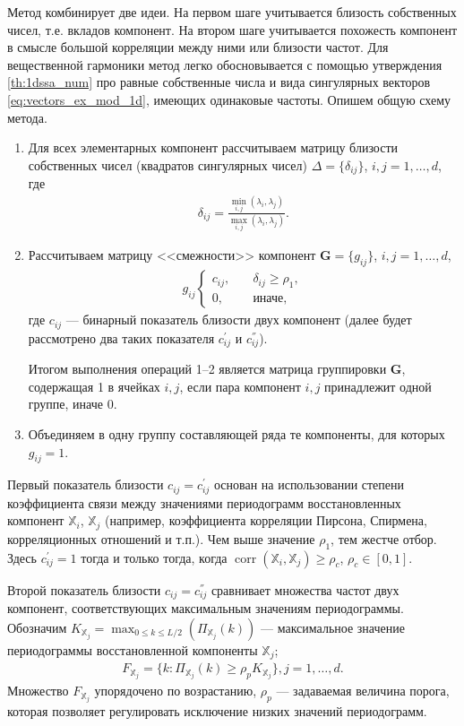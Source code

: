 \documentclass[specialist,
               substylefile = spbu.rtx,
               subf,href,colorlinks=true, 12pt]{disser}
\def\corr{\mathop{\mathrm{corr}}}
\begin{document}
Метод комбинирует две идеи. На первом шаге учитывается близость собственных чисел, т.е. вкладов компонент. На втором шаге учитывается похожесть компонент в смысле большой корреляции между ними или близости частот.
Для вещественной гармоники метод легко обосновывается с помощью утверждения \ref{th:1dssa_num} про равные собственные числа и вида сингулярных векторов \eqref{eq:vectors_ex_mod_1d}, имеющих одинаковые частоты.
Опишем общую схему метода.
\begin{enumerate}
\item Для всех элементарных компонент рассчитываем матрицу близости собственных чисел (квадратов сингулярных чисел) $\Delta = \{\delta_{ij}\}$, $i,j=1,\ldots,d$, где
\begin{gather}
\label{eq:delta}
\delta_{ij} = \frac{\min_{i, j}(\lambda_i, \lambda_j)}{\max_{i,j}(\lambda_i, \lambda_j)}.
\end{gather}
\item Рассчитываем матрицу <<смежности>> компонент $\mathbf{G}=\{g_{ij}\}$, $i,j = 1,\ldots,d$,
\begin{gather} \label{eq:g_ij}
g_{ij}
\begin{cases}
c_{ij}, &\quad \delta_{ij} \geqslant \rho_1, \\
0, &\quad \text{иначе},
\end{cases}
\end{gather}
где $c_{ij}$ --- бинарный показатель близости двух компонент (далее будет рассмотрено два таких показателя  $c^{'}_{ij}$ и  $c^{''}_{ij}$).

Итогом выполнения операций 1--2 является матрица группировки $\mathbf{G}$, содержащая 1 в ячейках $i,j$, если пара компонент $i,j$ принадлежит одной группе, иначе 0.
\item Объединяем в одну группу составляющей ряда те  компоненты, для которых $g_{ij} = 1$.
\end{enumerate}

Первый показатель близости $c_{ij} = c^{'}_{ij}$ основан на использовании
степени коэффициента связи между значениями периодограмм восстановленных компонент $\mathbb{X}_i$, $\mathbb{X}_j$ (например, коэффициента корреляции Пирсона, Спирмена, корреляционных отношений и т.п.). Чем выше значение $\rho_1$, тем жестче отбор.
Здесь $c^{'}_{ij} = 1$ тогда и только тогда, когда $\corr(\mathbb{X}_i, \mathbb{X}_j) \geqslant \rho_c$, $\rho_c \in [0,1]$.

Второй показатель близости $c_{ij} =c^{''}_{ij}$ сравнивает множества частот двух компонент, соответствующих максимальным значениям периодограммы.
Обозначим
$K_{\mathbb{X}_j} = \max_{0\leqslant k \leqslant L/2}\left(\Pi_{\mathbb{X}_j}(k)\right)$ --- максимальное значение периодограммы восстановленной компоненты $\mathbb{X}_j$;
\begin{gather} \label{eq:f_j}
F_{\mathbb{X}_j} =  \{ k: \Pi_{\mathbb{X}_j}(k) \geqslant \rho_p K_{\mathbb{X}_j}  \}, j = 1,\ldots, d.
\end{gather}
Множество $F_{\mathbb{X}_j}$ упорядочено по возрастанию, $\rho_p$ --- задаваемая величина порога, которая позволяет регулировать исключение низких значений периодограмм.
\end{document}
